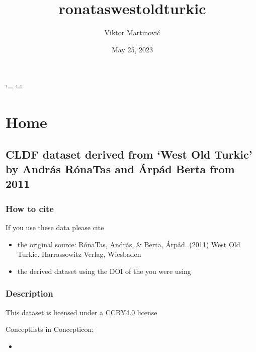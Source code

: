 \documentclass[letterpaper,10pt,english]{sphinxmanual}
\title{ronataswestoldturkic}
\date{May 25, 2023}
\author{Viktor Martinović}
\begin{document}
\ifdefined\shorthandoff
  \ifnum\catcode`\=\string=\active\shorthandoff{=}\fi
  \ifnum\catcode`\"=\active{}\fi
\fi

\pagestyle{empty}
\sphinxmaketitle
\pagestyle{plain}
\sphinxtableofcontents
\pagestyle{normal}
\label{\detokenize{index::doc}}


\sphinxstepscope


\chapter{Home}
\label{\detokenize{home:home}}\label{\detokenize{home::doc}}

\section{CLDF dataset derived from ‘West Old Turkic’ by András Róna\sphinxhyphen{}Tas and Árpád Berta from 2011}
\label{\detokenize{home:cldf-dataset-derived-from-west-old-turkic-by-andras-rona-tas-and-arpad-berta-from-2011}}

\subsection{How to cite}
\label{\detokenize{home:how-to-cite}}
\sphinxAtStartPar
If you use these data please cite
\begin{itemize}
\item {} 
\sphinxAtStartPar
the original source: Róna\sphinxhyphen{}Tas, András, \& Berta, Árpád. (2011)
West Old Turkic. Harrassowitz Verlag, Wiesbaden

\item {} 
\sphinxAtStartPar
the derived dataset using the DOI of the 
you were using

\end{itemize}


\subsection{Description}
\label{\detokenize{home:description}}
\sphinxAtStartPar
This dataset is licensed under a CC\sphinxhyphen{}BY\sphinxhyphen{}4.0 license

\sphinxAtStartPar
Conceptlists in Concepticon:
\begin{itemize}
\item {} 
\sphinxAtStartPar
{}

\end{itemize}
\end{document}
